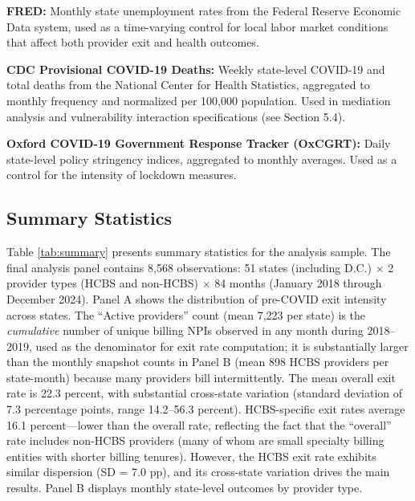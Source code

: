 \documentclass[12pt]{article}
\begin{document}
\textbf{FRED:} Monthly state unemployment rates from the Federal Reserve Economic Data system, used as a time-varying control for local labor market conditions that affect both provider exit and health outcomes.

\textbf{CDC Provisional COVID-19 Deaths:} Weekly state-level COVID-19 and total deaths from the National Center for Health Statistics, aggregated to monthly frequency and normalized per 100,000 population. Used in mediation analysis and vulnerability interaction specifications (see Section 5.4).

\textbf{Oxford COVID-19 Government Response Tracker (OxCGRT):} Daily state-level policy stringency indices, aggregated to monthly averages. Used as a control for the intensity of lockdown measures.

\subsection{Summary Statistics}



Table \ref{tab:summary} presents summary statistics for the analysis sample. The final analysis panel contains 8,568 observations: 51 states (including D.C.) $\times$ 2 provider types (HCBS and non-HCBS) $\times$ 84 months (January 2018 through December 2024). Panel A shows the distribution of pre-COVID exit intensity across states. The ``Active providers'' count (mean 7,223 per state) is the \emph{cumulative} number of unique billing NPIs observed in any month during 2018--2019, used as the denominator for exit rate computation; it is substantially larger than the monthly snapshot counts in Panel B (mean 898 HCBS providers per state-month) because many providers bill intermittently. The mean overall exit rate is 22.3 percent, with substantial cross-state variation (standard deviation of 7.3 percentage points, range 14.2--56.3 percent). HCBS-specific exit rates average 16.1 percent---lower than the overall rate, reflecting the fact that the ``overall'' rate includes non-HCBS providers (many of whom are small specialty billing entities with shorter billing tenures). However, the HCBS exit rate exhibits similar dispersion (SD = 7.0 pp), and its cross-state variation drives the main results. Panel B displays monthly state-level outcomes by provider type.
\end{document}

